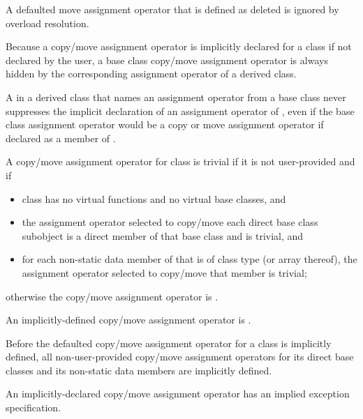 \begin{note}
A defaulted move assignment operator that is defined as deleted is ignored by
overload resolution.
\end{note}

\pnum
{}%
%
Because a copy/move assignment operator is implicitly declared for a class
if not declared by the user,
a base class copy/move assignment operator is always hidden
by the corresponding assignment operator of a derived class.
\begin{note}
A  in a derived class 
that names an assignment operator from a base class
never suppresses the implicit declaration of
an assignment operator of ,
even if the base class assignment operator would be
a copy or move assignment operator
if declared as a member of .
\end{note}

\pnum
{}%
%
A copy/move assignment operator for class
is
trivial
if it is not user-provided and if
\begin{itemize}
\item
class
has no virtual functions
and no virtual base classes, and

\item the assignment operator selected to copy/move each direct
base class subobject is a direct member of that base class and is trivial, and

\item
for each non-static data member of
that is of class type (or array thereof),
the assignment operator selected to copy/move that member is trivial;
\end{itemize}
%
otherwise the copy/move assignment operator is
.

\pnum
An implicitly-defined copy/move assignment operator is .

\pnum
Before the defaulted copy/move assignment operator for a class is
implicitly defined,
all non-user-provided copy/move assignment operators for
its direct base classes and
its non-static data members are implicitly defined.
\begin{note}
An implicitly-declared copy/move assignment operator has an
implied exception specification.
\end{note}

